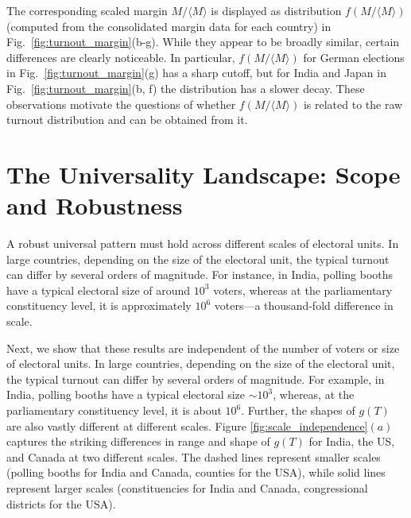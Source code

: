 The corresponding scaled margin $M/\langle M \rangle$ is displayed as distribution $f(M/\langle M \rangle)$ (computed from the consolidated margin data for each country) in Fig.~\ref{fig:turnout_margin}(b-g). While they appear to be broadly similar, certain differences are clearly noticeable. In particular, $f(M/\langle M \rangle)$ for German elections in Fig.~\ref{fig:turnout_margin}(g) has a sharp cutoff, but for India and Japan in Fig.~\ref{fig:turnout_margin}(b, f) the distribution has a slower decay. These observations motivate the questions of whether $f(M/\langle M \rangle)$ is related to the raw turnout distribution and can be obtained from it.

\section{The Universality Landscape: Scope and Robustness}

A robust universal pattern must hold across different scales of electoral units. In large countries, depending on the size of the electoral unit, the typical turnout can differ by several orders of magnitude. For instance, in India, polling booths have a typical electoral size of around $10^3$ voters, whereas at the parliamentary constituency level, it is approximately $10^6$ voters—a thousand-fold difference in scale.

Next, we show that these results are independent of the number of voters or size of electoral units. In large countries, depending on the size of the electoral unit, the typical turnout can differ by several orders of magnitude. For example, in India, polling booths have a typical electoral size $\sim 10^3$, whereas, at the parliamentary constituency level, it is about $10^6$. Further, the shapes of $g(T)$ are also vastly different at different scales. Figure \ref{fig:scale_independence}$(a)$ captures the striking differences in range and shape of $g(T)$ for India, the US, and Canada at two different scales. The dashed lines represent smaller scales (polling booths for India and Canada, counties for the USA), while solid lines represent larger scales (constituencies for India and Canada, congressional districts for the USA).

